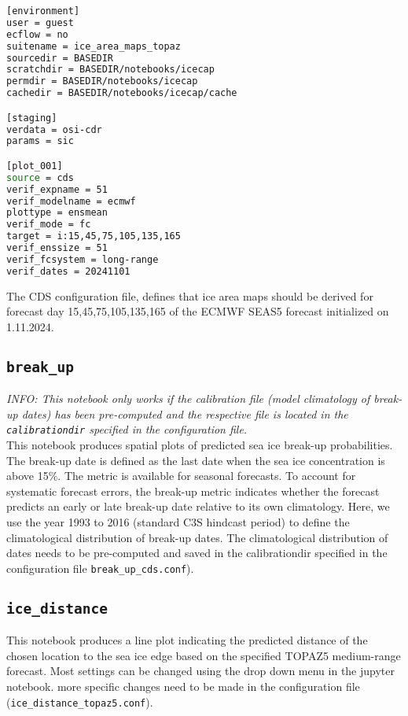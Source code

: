 \documentclass[DIV=10, parskip=full]{scrreprt}
\newcommand{\info}[1]{\textit{INFO: #1}}
\begin{document}
\begin{lstlisting}[language=bash]
[environment]
user = guest
ecflow = no
suitename = ice_area_maps_topaz
sourcedir = BASEDIR
scratchdir = BASEDIR/notebooks/icecap
permdir = BASEDIR/notebooks/icecap
cachedir = BASEDIR/notebooks/icecap/cache

[staging]
verdata = osi-cdr
params = sic

[plot_001]
source = cds
verif_expname = 51
verif_modelname = ecmwf
plottype = ensmean
verif_mode = fc
target = i:15,45,75,105,135,165
verif_enssize = 51
verif_fcsystem = long-range
verif_dates = 20241101
\end{lstlisting}

The CDS configuration file, defines that ice area maps should be derived for forecast day 15,45,75,105,135,165 of the ECMWF SEAS5 forecast initialized on 1.11.2024. 

\subsection{\texttt{break\_up}}
\info{This notebook only works if the calibration file (model climatology of break-up dates) has been pre-computed and the respective file is located in the \texttt{calibrationdir} specified in the configuration file.}\\

This notebook produces spatial plots of predicted sea ice break-up probabilities. The break-up date is defined as the last date when the sea ice concentration is above 15\%. The metric is available for seasonal forecasts. To account for systematic forecast errors, the break-up metric indicates whether the forecast predicts an early or late break-up date relative to its own climatology. Here, we use the year 1993 to 2016 (standard C3S hindcast period) to define the climatological distribution of break-up dates. The climatological distribution of dates needs to be pre-computed and saved in the calibrationdir specified in the configuration file  \texttt{break\_up\_cds.conf}).

\subsection{\texttt{ice\_distance}}
This notebook produces a line plot indicating the predicted distance of the chosen location to the sea ice edge based on the specified TOPAZ5 medium-range forecast. Most settings can be changed using the drop down menu in the jupyter notebook. more specific changes need to be made in the configuration file (\texttt{ice\_distance\_topaz5.conf}).
\end{document}
